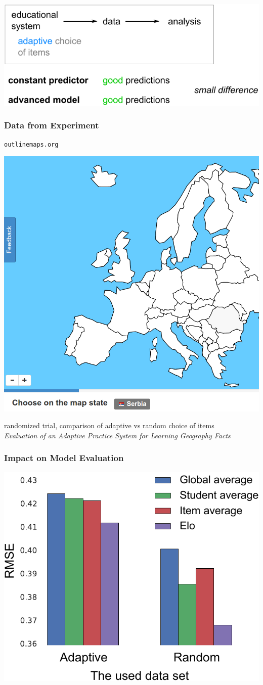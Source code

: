 \documentclass[bigger]{beamer}
\begin{document}
\begin{frame}
   \begin{center}
    \includegraphics[width=\linewidth]{intro-models2}
   \end{center}
\end{frame}

\begin{frame}
  \frametitle{Data from Experiment}

  \begin{center}
    \texttt{outlinemaps.org}
    \medskip

    \includegraphics[width=.35\linewidth]{slepemapy-screenshot1}
  \end{center}

  \bigskip 

  randomized trial, comparison of adaptive vs random choice of items\\

  {\footnotesize \emph{Evaluation of an Adaptive Practice System for Learning
      Geography Facts}}
\end{frame}

\begin{frame}
  \frametitle{Impact on Model Evaluation}
  \begin{center}
    \includegraphics[width=.7\linewidth]{AB-groups-vs-models0}
  \end{center}
\end{frame}
\end{document}
